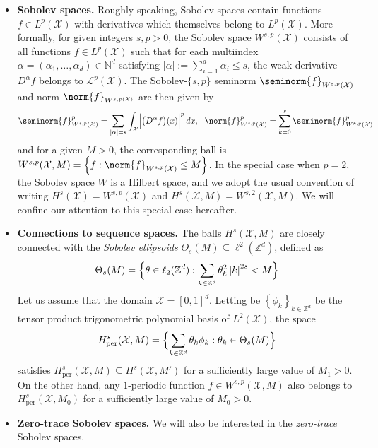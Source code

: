 \documentclass{article}
\newcommand{\abs}[1]{\left \lvert #1 \right \rvert}
\newcommand{\set}[1]{\left\{#1\right\}}
\newcommand{\1}{\mathbf{1}}
\newcommand{\Xset}{\mathcal{X}}
\newcommand{\Leb}{L}
\theoremstyle{alden}
\theoremstyle{aldenthm}
\theoremstyle{definition}
\theoremstyle{remark}
\begin{document}
\begin{itemize}
	\item \textbf{Sobolev spaces.}  Roughly speaking, Sobolev spaces contain functions $f \in \Leb^p(\Xset)$ with derivatives which themselves belong to $\Leb^p(\Xset)$. More formally, for given integers $s, p > 0$, the Sobolev space $W^{s,p}(\Xset)$ consists of all functions $f \in \Leb^p(\Xset)$ such that for each multiindex $\alpha = (\alpha_1,\ldots,\alpha_d) \in \mathbb{N}^d$ satisfying $\abs{\alpha} := \sum_{i = 1}^{d} \alpha_i \leq s$, the weak derivative $D^{\alpha}f$ belongs to $\mathcal{L}^p(\Xset)$. The Sobolev-$\{s,p\}$ seminorm $\seminorm{f}_{W^{s,p}(\Xset)}$ and norm $\norm{f}_{W^{s,p(\Xset)}}$ are then given by 
	\begin{equation*}
	\seminorm{f}_{W^{s,p}(\Xset)}^p = \sum_{\abs{\alpha} = s}\int_{\mathcal{X}} \Bigl|\bigl(D^{\alpha}f\bigr)(x)\Bigr|^p \,dx, ~~ \norm{f}_{W^{s,p}(\Xset)}^p = \sum_{k = 0}^{s} \seminorm{f}_{W^{k,p}(\Xset)}^p
	\end{equation*}
	and for a given $M > 0$, the corresponding ball is $W^{s,p}(\Xset, M) = \set{f: \norm{f}_{W^{s,p}(\Xset)} \leq M}$. In the special case when $p = 2$, the Sobolev space $W$ is a Hilbert space, and we adopt the usual convention of writing $H^s(\Xset) = W^{s,p}(\Xset)$ and $H^s(\Xset,M) = W^{s,2}(\Xset,M)$. We will confine our attention to this special case hereafter. 
	\item \textbf{Connections to sequence spaces.} The balls $H^s(\Xset,M)$ are closely connected with the \emph{Sobolev ellipsoids} $\Theta_s(M) \subseteq \ell^2(\mathbb{Z}^d)$, defined as
	\begin{equation*}
	\Theta_s(M) = \Bigl\{\theta \in \ell_2(\mathbb{Z}^d): \sum_{k \in \mathbb{Z}^d} \theta_k^2 \abs{k}^{2s} < M\Bigr\}
	\end{equation*}
	Let us assume that the domain $\Xset = [0,1]^d$. Letting be $\set{\phi_k}_{k \in \mathbb{Z}^d}$ be the tensor product trigonometric polynomial basis of $\Leb^2(\Xset)$, the space
	\begin{equation*}
	H_{\textrm{per}}^s(\Xset,M) = \Bigl\{\sum_{k \in \mathbb{Z}^d} \theta_k \phi_k: \theta_k \in \Theta_s(M) \Bigr\}
	\end{equation*}
	satisfies $H_{\textrm{per}}^s(\Xset,M) \subseteq H^s(\Xset,M')$ for a sufficiently large value of $M_1 > 0$. On the other hand, any $1$-periodic function $f \in W^{s,p}(\Xset,M)$ also belongs to $H_{\textrm{per}}^s(\Xset,M_0)$ for a sufficiently large value of $M_0 > 0$.
	\item \textbf{Zero-trace Sobolev spaces.} We will also be interested in the \emph{zero-trace} Sobolev spaces.
\end{itemize}
\end{document}
